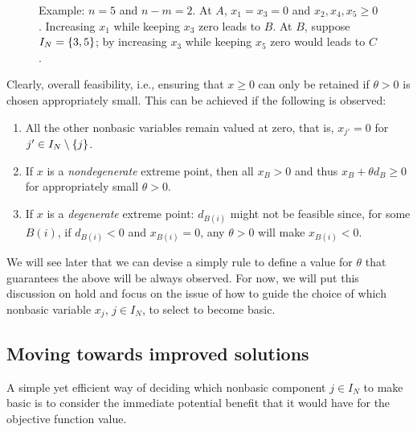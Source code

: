 \begin{figure}[h]
	\caption{Example: $n = 5$ and $n-m = 2$. At $A$, $x_1 = x_3 = 0$ and $x_2, x_4, x_5 \geq 0$. Increasing $x_1$ while keeping $x_3$ zero leads to $B$. At $B$, suppose $I_N = \left\{ 3,5 \right \}$; by increasing $x_3$ while keeping $x_5$ zero would leads to $C$.} \label{p1c3:fig:adjacent_vertices}
\end{figure}

Clearly, overall feasibility, i.e., ensuring that $x \ge 0$ can only be retained if $\theta > 0$ is chosen appropriately small. This can be achieved if the following is observed:
%
\begin{enumerate}
	\item All the other nonbasic variables remain valued at zero, that is, $x_{j'} = 0$ for $j' \in I_N \setminus \left\{ j \right \}$.	
	\item If $x$ is a \emph{nondegenerate} extreme point, then all $x_B > 0$ and thus $x_B + \theta d_B \geq 0$ for appropriately small $\theta > 0$. 
	\item If $x$ is a \emph{degenerate} extreme point: $d_{B(i)}$ might not be feasible since, for some $B(i)$, if $d_{B(i)} < 0$ and $x_{B(i)} = 0$, any $\theta > 0$ will make $x_{B(i)} < 0$.
\end{enumerate}
%
We will see later that we can devise a simply rule to define a value for $\theta$ that guarantees the above will be always observed. For now, we will put this discussion on hold and focus on the issue of how to guide the choice of which nonbasic variable $x_j$, $j \in I_N$, to select to become basic.


\subsection{Moving towards improved solutions}

A simple yet efficient way of deciding which nonbasic component $j \in I_N$ to make basic is to consider the immediate potential benefit that it would have for the objective function value. 

